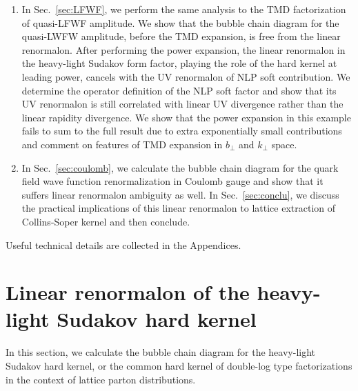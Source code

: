 \documentclass[a4paper,11pt]{article}
\begin{document}
\begin{enumerate}
    We then use explicit analytical result of bubble chain diagram~\cite{Braun:2018brg} to perform the threshold expansion both in coordinate and moment space. The threshold factorization formula at leading threshold power is verified at the bubble chain level. The linear renormalon cancels between the heavy-light hard kernel at leading threshold power and the NLP threshold soft factor.
We identify the operator definition for the NLP contribution and demonstrate that its linear renormalon is UV. We show that the ``genuine'' IR renormalons related to $z\Lambda_{\rm QCD}$ power corrections remain the same before and after threshold expansion.  We further investigate the ``resurgence'' of full distribution from threshold asymptotics by noticing the correlation between Borel ambiguity of $e^{-i\lambda}$ terms (corresponding to $\alpha \rightarrow 1$ threshold asymptotics) and branch ambiguity of purely algebraic terms (corresponding to $\alpha \rightarrow 0$ asymptotics).
\item In Sec.~\ref{sec:LFWF}, we perform the same analysis to the TMD factorization of quasi-LFWF amplitude. We show that the bubble chain diagram for the quasi-LWFW amplitude, before the TMD expansion, is free from the linear renormalon. After performing the power expansion, the linear renormalon in the heavy-light Sudakov form factor, playing the role of the hard kernel at leading power, cancels with the UV renormalon of NLP soft contribution. We determine the operator definition of the NLP soft factor and show that its UV renormalon is still correlated with linear UV divergence rather than the linear rapidity divergence. We show that the power expansion in this example fails to sum to the full result due to extra exponentially small contributions and comment on features of TMD expansion in $b_\perp$ and $k_\perp$ space.
\item In Sec.~\ref{sec:coulomb}, we calculate the bubble chain diagram for the quark field wave function renormalization in Coulomb gauge and show that it suffers linear renormalon ambiguity as well.  In Sec.~\ref{sec:conclu}, we discuss the practical implications of this linear renormalon to lattice extraction of Collins-Soper kernel and then conclude.
\end{enumerate}
Useful technical details are collected in the Appendices. 



\section{Linear renormalon of the heavy-light Sudakov hard kernel}\label{sec:HLbubble}
In this section, we calculate the bubble chain diagram for the heavy-light Sudakov hard kernel, or the common hard kernel of double-log type factorizations in the context of lattice parton distributions. 
\end{document}

